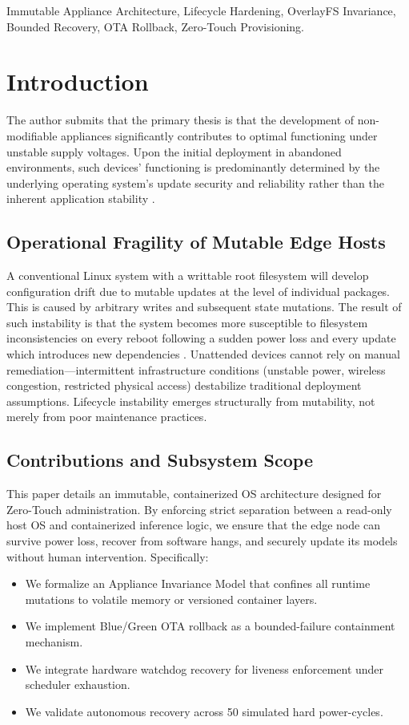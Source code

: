 \documentclass[conference]{IEEEtran}
\begin{document}
\begin{IEEEkeywords}
Immutable Appliance Architecture, Lifecycle Hardening, OverlayFS Invariance, Bounded Recovery, OTA Rollback, Zero-Touch Provisioning.
\end{IEEEkeywords}

\section{Introduction}

The author submits that the primary thesis is that the development of non-modifiable appliances significantly contributes to optimal functioning under unstable supply voltages. Upon the initial deployment in abandoned environments, such devices’ functioning is predominantly determined by the underlying operating system’s update security and reliability rather than the inherent application stability \cite{b1, b2, b3}.

\subsection{Operational Fragility of Mutable Edge Hosts}
A conventional Linux system with a writtable root filesystem will develop configuration drift due to mutable updates at the level of individual packages. This is caused by arbitrary writes and subsequent state mutations. The result of such instability is that the system becomes more susceptible to filesystem inconsistencies on every reboot following a sudden power loss and every update which introduces new dependencies \cite{b4, b12, b17}. Unattended devices cannot rely on manual remediation---intermittent infrastructure conditions (unstable power, wireless congestion, restricted physical access) destabilize traditional deployment assumptions. Lifecycle instability emerges structurally from mutability, not merely from poor maintenance practices.

\subsection{Contributions and Subsystem Scope}
This paper details an immutable, containerized OS architecture designed for Zero-Touch administration. By enforcing strict separation between a read-only host OS and containerized inference logic, we ensure that the edge node can survive power loss, recover from software hangs, and securely update its models without human intervention. Specifically:
\begin{itemize}
    \item We formalize an Appliance Invariance Model that confines all runtime mutations to volatile memory or versioned container layers.
    \item We implement Blue/Green OTA rollback as a bounded-failure containment mechanism.
    \item We integrate hardware watchdog recovery for liveness enforcement under scheduler exhaustion.
    \item We validate autonomous recovery across 50 simulated hard power-cycles.
\end{itemize}
\end{document}
